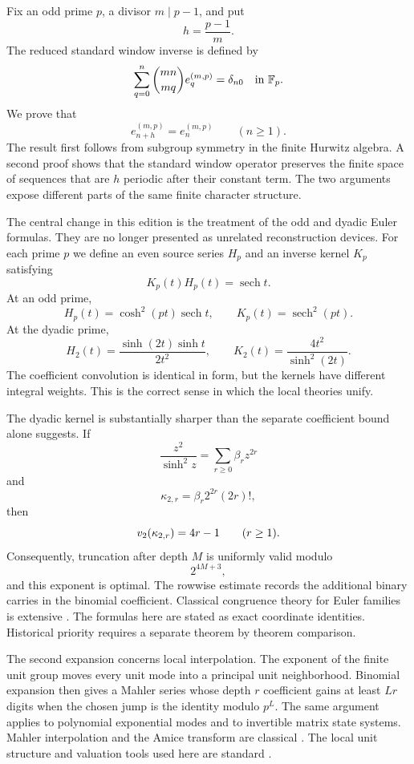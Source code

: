 Fix an odd prime \(p\), a divisor \(m\mid p-1\), and put
\[
h=\frac{p-1}{m}.
\]
The reduced standard window inverse is defined by
\[
\sum_{q=0}^{n}
\binom{mn}{mq}e_q^{(m,p)}
=
\delta_{n0}
\quad\text{in }\mathbb F_p.
\]
We prove that
\[
e_{n+h}^{(m,p)}=e_n^{(m,p)}
\qquad(n\geq1).
\]
The result first follows from subgroup symmetry in the finite Hurwitz algebra. A second proof shows that the standard window operator preserves the finite space of sequences that are \(h\) periodic after their constant term. The two arguments expose different parts of the same finite character structure.

The central change in this edition is the treatment of the odd and dyadic Euler formulas. They are no longer presented as unrelated reconstruction devices. For each prime \(p\) we define an even source series \(H_p\) and an inverse kernel \(K_p\) satisfying
\[
K_p(t)H_p(t)=\operatorname{sech}t.
\]
At an odd prime,
\[
H_p(t)=\cosh^2(pt)\operatorname{sech}t,
\qquad
K_p(t)=\operatorname{sech}^2(pt).
\]
At the dyadic prime,
\[
H_2(t)=\frac{\sinh(2t)\sinh t}{2t^2},
\qquad
K_2(t)=\frac{4t^2}{\sinh^2(2t)}.
\]
The coefficient convolution is identical in form, but the kernels have different integral weights. This is the correct sense in which the local theories unify.

The dyadic kernel is substantially sharper than the separate coefficient bound alone suggests. If
\[
\frac{z^2}{\sinh^2z}
=
\sum_{r\geq0}\beta_rz^{2r}
\]
and
\[
\kappa_{2,r}=\beta_r2^{2r}(2r)!,
\]
then
\[
v_2(\kappa_{2,r})=4r-1
\qquad(r\geq1).
\]
Consequently, truncation after depth \(M\) is uniformly valid modulo
\[
2^{4M+3},
\]
and this exponent is optimal. The rowwise estimate records the additional binary carries in the binomial coefficient. Classical congruence theory for Euler families is extensive \cite{CarlitzLevine1960,Young1999,Young2001,Sun2008,Chen2004}. The formulas here are stated as exact coordinate identities. Historical priority requires a separate theorem by theorem comparison.

The second expansion concerns local interpolation. The exponent of the finite unit group moves every unit mode into a principal unit neighborhood. Binomial expansion then gives a Mahler series whose depth \(r\) coefficient gains at least \(Lr\) digits when the chosen jump is the identity modulo \(p^L\). The same argument applies to polynomial exponential modes and to invertible matrix state systems. Mahler interpolation and the Amice transform are classical \cite{Mahler1958,Amice1964,Robert2000}. The local unit structure and valuation tools used here are standard \cite{Koblitz1984,Serre1979,Washington1997,Gouvea1997}.

